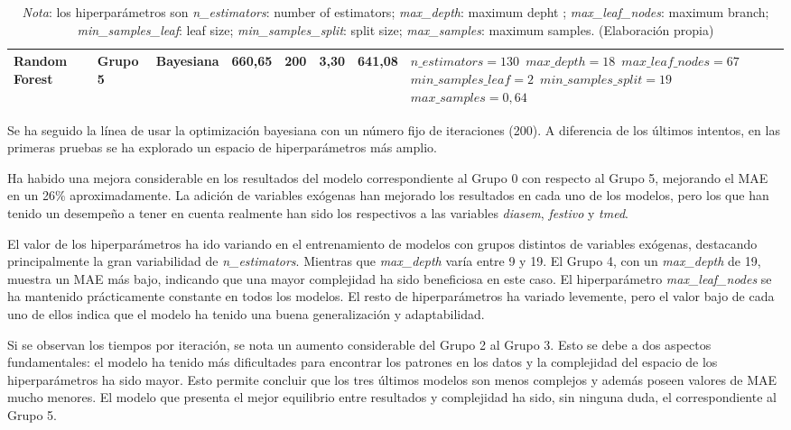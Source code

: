\documentclass[12pt,a4paper]{report}
\begin{document}
\begin{table}[H]
\begin{tabular}{m{1cm} m{1.2cm} m{1.2cm} m{1cm} m{1cm} m{1.2cm} m{1.2cm} m{3.5cm}}
\hline
Random Forest   & Grupo 5 & Bayesiana & 660,65  & 200 & 3,30 & 641,08 & \texttt{$n\_estimators=130$ \newline $max\_depth=18$ \newline $max\_leaf\_nodes=67$ \newline $min\_samples\_leaf=2$ \newline $min\_samples\_split=19$ \newline $max\_samples=0,64$} \\
\bottomrule
\end{tabular}
\label{tab:resultados_optimizacion}
\caption*{\textit{Nota}: los hiperparámetros son \textit{n\_estimators}: number of estimators; \textit{max\_depth}: maximum depht ; \textit{max\_leaf\_nodes}: maximum branch; \textit{min\_samples\_leaf}: leaf size; \textit{min\_samples\_split}: split size; \textit{max\_samples}: maximum samples. (Elaboración propia)}
\end{table}

Se ha seguido la línea de usar la optimización bayesiana con un número fijo de iteraciones (200). A diferencia de los últimos intentos, en las primeras pruebas se ha explorado un espacio de hiperparámetros más amplio.

 Ha habido una mejora considerable en los resultados del modelo correspondiente al Grupo 0 con respecto al Grupo 5, mejorando el MAE en un 26$\%$ aproximadamente. La adición de variables exógenas han mejorado los resultados en cada uno de los modelos, pero los que han tenido un desempeño a tener en cuenta realmente han sido los respectivos a las variables \textit{diasem}, \textit{festivo} y \textit{tmed}.

El valor de los hiperparámetros ha ido variando en el entrenamiento de modelos con grupos distintos de variables exógenas, destacando principalmente la gran variabilidad de \textit{n\_estimators}. Mientras que \textit{max\_depth} varía entre 9 y 19. El Grupo 4, con un \textit{max\_depth} de 19, muestra un MAE más bajo, indicando que una mayor complejidad ha sido beneficiosa en este caso. El hiperparámetro \textit{max\_leaf\_nodes} se ha mantenido prácticamente constante en todos los modelos. El resto de hiperparámetros ha variado levemente, pero el valor bajo de cada uno de ellos indica que el modelo ha tenido una buena generalización y adaptabilidad.

Si se observan los tiempos por iteración, se nota un aumento considerable del Grupo 2 al Grupo 3. Esto se debe a dos aspectos fundamentales: el modelo ha tenido más dificultades para encontrar los patrones en los datos y la complejidad del espacio de los hiperparámetros ha sido mayor. Esto permite concluir que los tres últimos modelos son menos complejos y además poseen valores de MAE mucho menores. El modelo que presenta el mejor equilibrio entre resultados y complejidad ha sido, sin ninguna duda, el correspondiente al Grupo 5.
\end{document}
